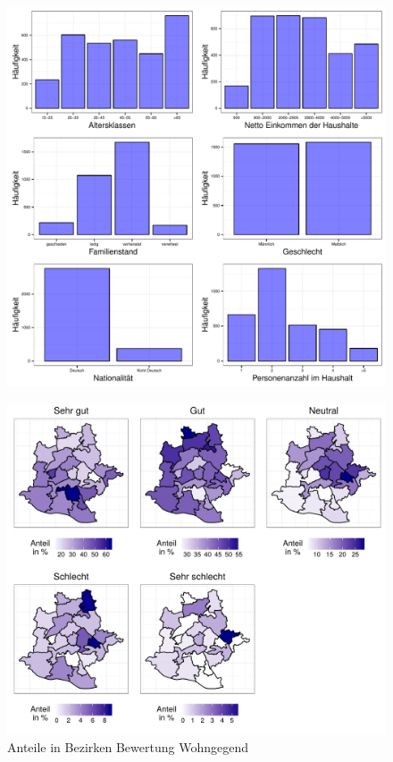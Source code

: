 \documentclass{Vorlage}
\begin{document}
\begin{appendix}
\begin{figure}[h]
 \begin{center}
 \includegraphics[scale=0.8]{Pictures/BarData}
 \end{center}
\end{figure}


\begin{figure}[h]
 \begin{center}
 \includegraphics[scale=0.8]{Pictures/BWohn}
 \caption{Anteile in Bezirken Bewertung Wohngegend}
 \label{BWohn}
 \end{center}
\end{figure}


\end{appendix}
\end{document}
